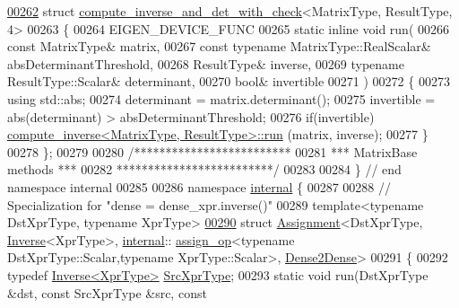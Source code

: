 \begin{DoxyCode}
\hyperlink{struct_eigen_1_1internal_1_1compute__inverse__and__det__with__check_3_01_matrix_type_00_01_result_type_00_014_01_4}{00262} \textcolor{keyword}{struct }\hyperlink{struct_eigen_1_1internal_1_1compute__inverse__and__det__with__check}{compute\_inverse\_and\_det\_with\_check}<MatrixType, ResultType, 4>
00263 \{
00264   EIGEN\_DEVICE\_FUNC
00265   \textcolor{keyword}{static} \textcolor{keyword}{inline} \textcolor{keywordtype}{void} run(
00266     \textcolor{keyword}{const} MatrixType& matrix,
00267     \textcolor{keyword}{const} \textcolor{keyword}{typename} MatrixType::RealScalar& absDeterminantThreshold,
00268     ResultType& inverse,
00269     \textcolor{keyword}{typename} ResultType::Scalar& determinant,
00270     \textcolor{keywordtype}{bool}& invertible
00271   )
00272   \{
00273     \textcolor{keyword}{using} std::abs;
00274     determinant = matrix.determinant();
00275     invertible = abs(determinant) > absDeterminantThreshold;
00276     \textcolor{keywordflow}{if}(invertible) \hyperlink{struct_eigen_1_1internal_1_1compute__inverse}{compute\_inverse<MatrixType, ResultType>::run}
      (matrix, inverse);
00277   \}
00278 \};
00279 
00280 \textcolor{comment}{/*************************}
00281 \textcolor{comment}{*** MatrixBase methods ***}
00282 \textcolor{comment}{*************************/}
00283 
00284 \} \textcolor{comment}{// end namespace internal}
00285 
00286 \textcolor{keyword}{namespace }\hyperlink{namespaceinternal}{internal} \{
00287 
00288 \textcolor{comment}{// Specialization for "dense = dense\_xpr.inverse()"}
00289 \textcolor{keyword}{template}<\textcolor{keyword}{typename} DstXprType, \textcolor{keyword}{typename} XprType>
\hyperlink{struct_eigen_1_1internal_1_1_assignment_3_01_dst_xpr_type_00_01_inverse_3_01_xpr_type_01_4_00_019b24182f99081c1fc09beae63c4c392d}{00290} \textcolor{keyword}{struct }\hyperlink{struct_eigen_1_1internal_1_1_assignment}{Assignment}<DstXprType, \hyperlink{class_eigen_1_1_inverse}{Inverse}<XprType>, \hyperlink{namespaceinternal}{internal}::
      \hyperlink{struct_eigen_1_1internal_1_1assign__op}{assign\_op}<typename DstXprType::Scalar,typename XprType::Scalar>, 
      \hyperlink{struct_eigen_1_1internal_1_1_dense2_dense}{Dense2Dense}>
00291 \{
00292   \textcolor{keyword}{typedef} \hyperlink{class_eigen_1_1_inverse}{Inverse<XprType>} \hyperlink{class_eigen_1_1_inverse}{SrcXprType};
00293   \textcolor{keyword}{static} \textcolor{keywordtype}{void} run(DstXprType &dst, \textcolor{keyword}{const} SrcXprType &src, \textcolor{keyword}{const} 

\end{DoxyCode}
